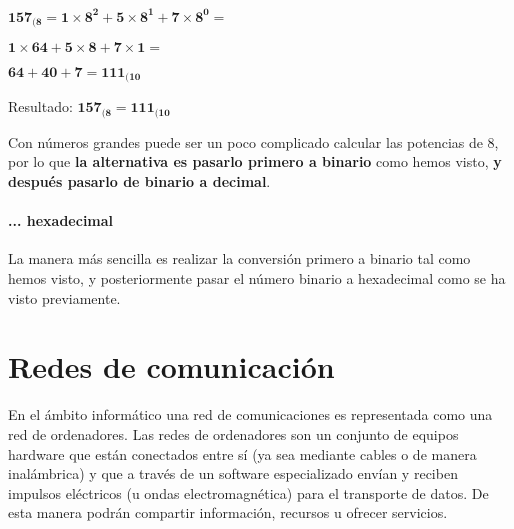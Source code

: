 \begin{center}
    \vspace{-15pt}
    $\mathbf{157_{(8} = 1\times8^2 + 5\times8^1 + 7\times8^0 = }$

    $\mathbf{1\times64 + 5\times8 + 7\times1 = }$

    $\mathbf{64 + 40 + 7 = 111_{(10}}$

    Resultado: $\mathbf{157_{(8} = 111_{(10}}$
    \vspace{-15pt}
\end{center}

Con números grandes puede ser un poco complicado calcular las potencias de 8, por lo que \textbf{la alternativa es pasarlo primero a binario} como hemos visto, \textbf{y después pasarlo de binario a decimal}.

\subsubsection*{... hexadecimal}
La manera más sencilla es realizar la conversión primero a binario tal como hemos visto, y posteriormente pasar el número binario a hexadecimal como se ha visto previamente.


\chapter{Redes de comunicación}
En el ámbito informático una red de comunicaciones es representada como una red de ordenadores. Las redes de ordenadores son un conjunto de equipos hardware que están conectados entre sí (ya sea mediante cables o de manera inalámbrica) y que a través de un software especializado envían y reciben impulsos eléctricos (u ondas electromagnética) para el transporte de datos. De esta manera podrán compartir información, recursos u ofrecer servicios.


